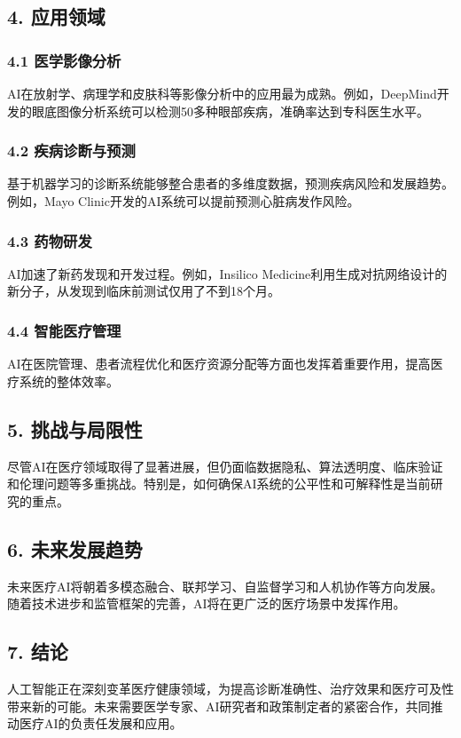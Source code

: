 \subsection{4. 应用领域}
\subsubsection{4.1 医学影像分析}
AI在放射学、病理学和皮肤科等影像分析中的应用最为成熟。例如，DeepMind开发的眼底图像分析系统可以检测50多种眼部疾病，准确率达到专科医生水平。

\subsubsection{4.2 疾病诊断与预测}
基于机器学习的诊断系统能够整合患者的多维度数据，预测疾病风险和发展趋势。例如，Mayo Clinic开发的AI系统可以提前预测心脏病发作风险。

\subsubsection{4.3 药物研发}
AI加速了新药发现和开发过程。例如，Insilico Medicine利用生成对抗网络设计的新分子，从发现到临床前测试仅用了不到18个月。

\subsubsection{4.4 智能医疗管理}
AI在医院管理、患者流程优化和医疗资源分配等方面也发挥着重要作用，提高医疗系统的整体效率。

\subsection{5. 挑战与局限性}
尽管AI在医疗领域取得了显著进展，但仍面临数据隐私、算法透明度、临床验证和伦理问题等多重挑战。特别是，如何确保AI系统的公平性和可解释性是当前研究的重点。

\subsection{6. 未来发展趋势}
未来医疗AI将朝着多模态融合、联邦学习、自监督学习和人机协作等方向发展。随着技术进步和监管框架的完善，AI将在更广泛的医疗场景中发挥作用。

\subsection{7. 结论}
人工智能正在深刻变革医疗健康领域，为提高诊断准确性、治疗效果和医疗可及性带来新的可能。未来需要医学专家、AI研究者和政策制定者的紧密合作，共同推动医疗AI的负责任发展和应用。

